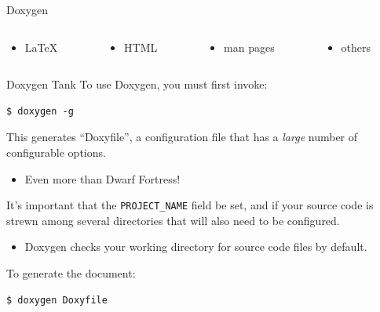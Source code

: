 \documentclass[11pt]{beamer}
\begin{document}
\begin{frame}[fragile=singleslide]{Doxygen}
\begin{columns}
\begin{column}{0.25\textwidth}
\begin{itemize}
\item \LaTeX
\end{itemize}
\end{column}
\begin{column}{0.25\textwidth}
\begin{itemize}
\item HTML
\end{itemize}
\end{column}
\begin{column}{0.25\textwidth}
\begin{itemize}
\item man pages
\end{itemize}
\end{column}
\begin{column}{0.25\textwidth}
\begin{itemize}
\item others
\end{itemize}
\end{column}
\end{columns}
\end{frame}

\begin{frame}[fragile=singleslide]{Doxygen Tank}
To use Doxygen, you must first invoke:
\begin{lstlisting}[style=terminal]
$ doxygen -g
\end{lstlisting}
This generates ``Doxyfile'', a configuration file that has a \emph{large} number of configurable options.  
\begin{itemize}
\item Even more than Dwarf Fortress! 
\end{itemize}
It's important that the \texttt{PROJECT\_NAME} field be set, and if your source code is strewn among several directories that will also need to be configured.
\begin{itemize}
\item Doxygen checks your working directory for source code files by default.
\end{itemize}
To generate the document: 
\begin{lstlisting}[style=terminal]
$ doxygen Doxyfile
\end{lstlisting}
\end{frame}
\end{document}
